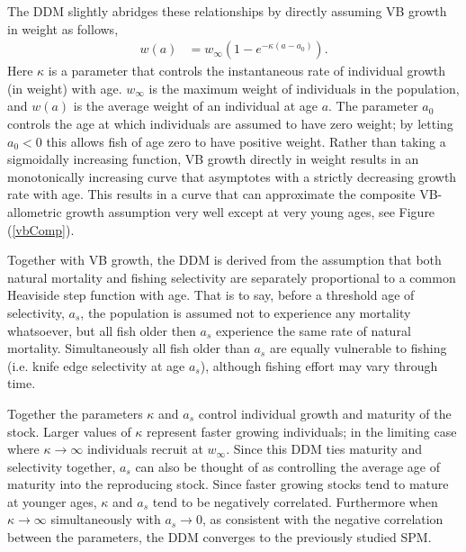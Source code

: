 %
The DDM slightly abridges these relationships by directly assuming VB
growth in weight as follows,
%
\begin{align}
w(a) &= w_\infty(1-e^{-\kappa (a-a_0)}). \label{vbGrowth}
\end{align}
%
Here $\kappa$ is a parameter that controls the instantaneous rate of individual
growth (in weight) with age. $w_\infty$ is the maximum weight of individuals
in the population, and $w(a)$ is the average weight of an individual at
age $a$. The parameter $a_0$ controls the age at which individuals are assumed
to have zero weight; by letting $a_0<0$ this allows fish of age zero to have
positive weight. Rather than taking a sigmoidally increasing function, VB growth
directly in weight results in an monotonically increasing curve that asymptotes
with a strictly decreasing growth rate with age. This results in a curve that
can approximate the composite VB-allometric growth assumption very well except 
at very young ages, see Figure (\ref{vbComp}).

%
Together with VB growth, the DDM is derived from the assumption that
both natural mortality and fishing selectivity are separately proportional
to a common Heaviside step function with age. That is to say, before a threshold
age of selectivity, $a_s$, the population is assumed not to experience any
mortality whatsoever, but all fish older then $a_s$ experience the same rate
of natural mortality. Simultaneously all fish older than $a_s$ are equally
vulnerable to fishing (i.e. knife edge selectivity at age $a_s$), although
fishing effort may vary through time. 

%
Together the parameters $\kappa$ and $a_s$ control individual growth and 
maturity of the stock. Larger values of $\kappa$ represent faster growing 
individuals; in the limiting case where $\kappa\to\infty$ individuals recruit 
at $w_\infty$. Since this DDM ties maturity and selectivity together, $a_s$ can 
also be thought of as controlling the average age of maturity into the reproducing 
stock. Since faster growing stocks tend to mature at younger ages, $\kappa$ 
and $a_s$ tend to be negatively correlated. Furthermore when $\kappa\to\infty$ simultaneously 
with $a_s\to0$, as consistent with the negative correlation between the parameters, 
the DDM converges to the previously studied SPM.

